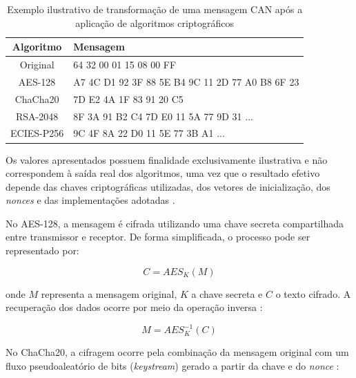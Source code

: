 \begin{table}[htbp]
\centering
\caption{Exemplo ilustrativo de transformação de uma mensagem CAN após a aplicação de algoritmos criptográficos}
\label{tab:exemplo_cifragem}

\begin{tabular}{|c|p{10cm}|}
\hline
\textbf{Algoritmo} & \textbf{Mensagem} \\
\hline

Original &
64 32 00 01 15 08 00 FF \\
\hline

AES-128 &
A7 4C D1 92 3F 88 5E B4 \newline
9C 11 2D 77 A0 B8 6F 23 \\
\hline

ChaCha20 &
7D E2 4A 1F 83 91 20 C5 \\
\hline

RSA-2048 &
8F 3A 91 B2 C4 7D E0 11 \newline
5A 77 9D 31 ... \\
\hline

ECIES-P256 &
9C 4F 8A 22 D0 11 5E 77 \newline
3B A1 ... \\
\hline

\end{tabular}
\end{table}
Os valores apresentados possuem finalidade exclusivamente ilustrativa e não correspondem à saída real dos algoritmos, uma vez que o resultado efetivo depende das chaves criptográficas utilizadas, dos vetores de inicialização, dos \textit{nonces} e das implementações adotadas \cite{ferguson2011cryptography}.

No AES-128, a mensagem é cifrada utilizando uma chave secreta compartilhada entre transmissor e receptor. De forma simplificada, o processo pode ser representado por:

\begin{equation}
C = AES_K(M)
\end{equation}

onde $M$ representa a mensagem original, $K$ a chave secreta e $C$ o texto cifrado. A recuperação dos dados ocorre por meio da operação inversa \cite{dworkin2001recommendation,primitives2003advanced}:

\begin{equation}
M = AES^{-1}_K(C)
\end{equation}

No ChaCha20, a cifragem ocorre pela combinação da mensagem original com um fluxo pseudoaleatório de bits (\textit{keystream}) gerado a partir da chave e do \textit{nonce} \cite{bernstein2008chacha,nir2018chacha20}:

